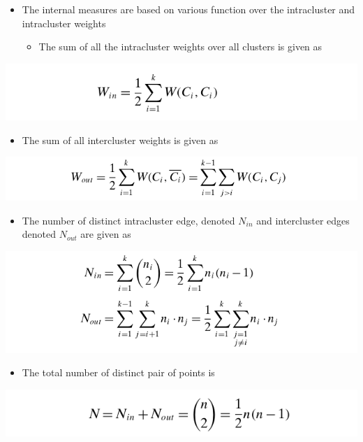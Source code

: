 \documentclass[11pt]{article}
\begin{document}
\begin{itemize}
\item The internal measures are based on various function over the intracluster and intracluster weights
\begin{itemize}
\item The sum of all the intracluster weights over all clusters is given as
\end{itemize}
\end{itemize}
\begin{center}
\includegraphics[width=.9\linewidth]{Clustering Validation/screenshot_2018-11-27_23-17-14.png}
\end{center}

\begin{itemize}
\item The sum of all intercluster weights is given as
\end{itemize}
\begin{center}
\includegraphics[width=.9\linewidth]{Clustering Validation/screenshot_2018-11-27_23-17-59.png}
\end{center}

\begin{itemize}
\item The number of distinct intracluster edge, denoted \(N_{in}\) and intercluster edges denoted \(N_{out}\) are given as
\end{itemize}
\begin{center}
\includegraphics[width=.9\linewidth]{Clustering Validation/screenshot_2018-11-27_23-18-52.png}
\end{center}

\begin{itemize}
\item The total number of distinct pair of points is
\end{itemize}
\begin{center}
\includegraphics[width=.9\linewidth]{Clustering Validation/screenshot_2018-11-27_23-19-25.png}
\end{center}
\end{document}
